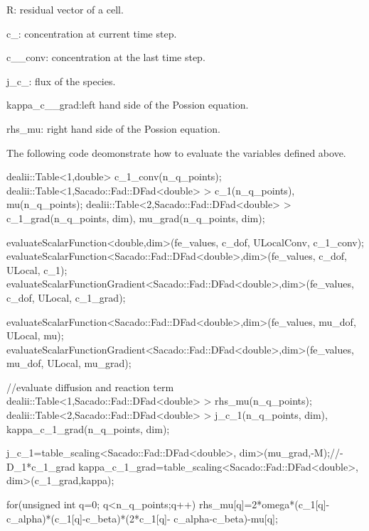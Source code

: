 R\-: residual vector of a cell.

c\-\_\-: concentration at current time step.

c\-\_\-\_\-conv\-: concentration at the last time step.

j\-\_\-c\-\_\-: flux of the species.

kappa\-\_\-c\-\_\-\_\-grad\-:left hand side of the Possion equation.

rhs\-\_\-mu\-: right hand side of the Possion equation. 

 The following code deomonstrate how to evaluate the variables defined above. 
\begin{DoxyCode}
dealii::Table<1,double>  c\_1\_conv(n\_q\_points);
dealii::Table<1,Sacado::Fad::DFad<double> > c\_1(n\_q\_points), mu(n\_q\_points);
dealii::Table<2,Sacado::Fad::DFad<double> >  c\_1\_grad(n\_q\_points, dim), mu\_grad(n\_q\_points, dim);

evaluateScalarFunction<double,dim>(fe\_values, c\_dof, ULocalConv, c\_1\_conv);
evaluateScalarFunction<Sacado::Fad::DFad<double>,dim>(fe\_values, c\_dof, ULocal, c\_1);   
evaluateScalarFunctionGradient<Sacado::Fad::DFad<double>,dim>(fe\_values, c\_dof, ULocal, c\_1\_grad);

evaluateScalarFunction<Sacado::Fad::DFad<double>,dim>(fe\_values, mu\_dof, ULocal, mu);   
evaluateScalarFunctionGradient<Sacado::Fad::DFad<double>,dim>(fe\_values, mu\_dof, ULocal, mu\_grad);

\textcolor{comment}{//evaluate diffusion and reaction term}
dealii::Table<1,Sacado::Fad::DFad<double> > rhs\_mu(n\_q\_points);
dealii::Table<2,Sacado::Fad::DFad<double> > j\_c\_1(n\_q\_points, dim), kappa\_c\_1\_grad(n\_q\_points, dim);

j\_c\_1=table\_scaling<Sacado::Fad::DFad<double>, dim>(mu\_grad,-M);\textcolor{comment}{//-D\_1*c\_1\_grad}
kappa\_c\_1\_grad=table\_scaling<Sacado::Fad::DFad<double>, dim>(c\_1\_grad,kappa);

\textcolor{keywordflow}{for}(\textcolor{keywordtype}{unsigned} \textcolor{keywordtype}{int} q=0; q<n\_q\_points;q++) rhs\_mu[q]=2*omega*(c\_1[q]-c\_alpha)*(c\_1[q]-c\_beta)*(2*c\_1[q]-
      c\_alpha-c\_beta)-mu[q];
\end{DoxyCode}


